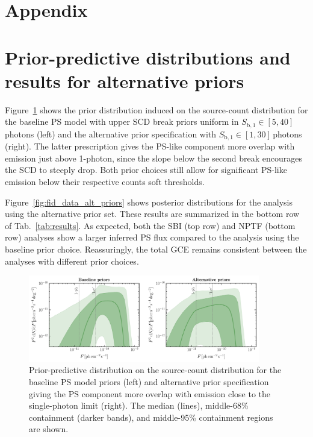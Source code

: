 \documentclass[prd,aps,10pt,nofootinbib,twocolumn,superscriptaddress,preprintnumbers,balancelastpage,longbibliography,floatfix]{revtex4-2}
\begin{document}



\vspace{.2cm}

\appendix
\section*{Appendix}

\section{Prior-predictive distributions and results for alternative priors}
\label{app:priors}

Figure~\ref{fig:pp_check} shows the prior distribution induced on the source-count distribution for the baseline PS model with upper SCD break priors uniform in $S_{\mathrm{b}, 1}  \in  [5, 40]$\,photons (left) and the alternative prior specification with $S_{\mathrm{b}, 1}  \in  [1, 30]$\,photons (right). The latter prescription gives the PS-like component more overlap with emission just above 1-photon, since the slope below the second break encourages the SCD to steeply drop. Both prior choices still allow for significant PS-like emission below their respective counts soft thresholds.

Figure~\ref{fig:fid_data_alt_priors} shows posterior distributions for the analysis using the alternative prior set. These results are summarized in the bottom row of Tab.~\ref{tab:results}. As expected, both the SBI (top row) and NPTF (bottom row) analyses show a larger inferred PS flux compared to the analysis using the baseline prior choice. Reassuringly, the total GCE remains consistent between the analyses with different prior choices.

%
\begin{figure}[!h]
\centering
\includegraphics[width=0.9\textwidth]{plots/pp_check.pdf}
\caption{Prior-predictive distribution on the source-count distribution for the baseline PS model priors (left) and alternative prior specification giving the PS component more overlap with emission close to the single-photon limit (right). The median (lines), middle-68\% containment (darker bands), and middle-95\% containment regions are shown.}
\label{fig:pp_check}
\end{figure}
%
    
\end{document}
